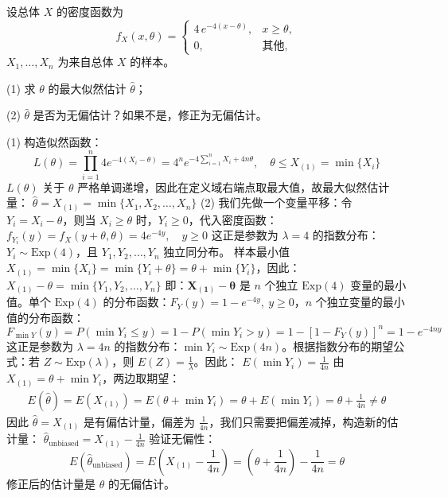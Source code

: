 \documentclass[lang=cn,11pt]{elegantbook}
\begin{document}
\begin{exercise}\label{exer:7-exp4-shift}
设总体 \(X\) 的密度函数为
\[
f_X(x,\theta) = \begin{cases} 4\,e^{-4(x-\theta)}, & x \geq \theta, \\ 0, & \text{其他}, \end{cases}
\]
\(X_1, \dots, X_n\) 为来自总体 \(X\) 的样本。\par
(1) 求 \(\theta\) 的最大似然估计 \(\hat{\theta}\)；\par
(2) \(\hat{\theta}\) 是否为无偏估计？如果不是，修正为无偏估计。
\end{exercise}
\begin{solution}
(1) 构造似然函数：
$$L(\theta) = \prod_{i=1}^n 4 e^{-4(X_i-\theta)} = 4^n e^{-4\sum_{i=1}^n X_i + 4n\theta}, \quad \theta \leq X_{(1)} = \min\{X_i\}$$
$L(\theta)$ 关于 $\theta$ 严格单调递增，因此在定义域右端点取最大值，故最大似然估计量：
\(\hat{\theta} = X_{(1)} = \min\{X_1,X_2,\dots,X_n\}\)
(2) 我们先做一个变量平移：令 $Y_i = X_i - \theta$，则当 $X_i \geq \theta$ 时，$Y_i \geq 0$，代入密度函数：
  \(  f_{Y_i}(y) = f_X(y+\theta,\theta) = 4 e^{-4y}, \quad y \geq 0  \)
  这正是参数为 $\lambda=4$ 的指数分布：$Y_i \sim \text{Exp}(4)$，且 $Y_1,Y_2,\dots,Y_n$ 独立同分布。
样本最小值 $X_{(1)} = \min\{X_i\} = \min\{Y_i+\theta\} = \theta + \min\{Y_i\}$，因此：
  \(  X_{(1)} - \theta = \min\{Y_1,Y_2,\dots,Y_n\}  \)
  即：$\mathbf{X_{(1)} - \theta}$ 是 $n$ 个独立 $\text{Exp}(4)$ 变量的最小值。单个 $\text{Exp}(4)$ 的分布函数：$F_Y(y) = 1 - e^{-4y},\ y\geq0$，$n$ 个独立变量的最小值的分布函数：
  $$  F_{\min Y}(y) = P(\min Y_i \leq y) = 1 - P(\min Y_i > y) = 1 - [1-F_Y(y)]^n = 1 - e^{-4ny}  $$
  这正是参数为 $\lambda=4n$ 的指数分布：$\min Y_i \sim \text{Exp}(4n)$。根据指数分布的期望公式：若 $Z \sim \text{Exp}(\lambda)$，则 $E(Z) = \frac{1}{\lambda}$。因此：
  \(  E\left(\min Y_i\right) = \frac{1}{4n}  \)
由 $X_{(1)} = \theta + \min Y_i$，两边取期望：
\begin{align*}
E(\hat{\theta}) = E(X_{(1)}) = E\left(\theta + \min Y_i\right) = \theta + E\left(\min Y_i\right) = \theta + \frac{1}{4n}\neq \theta
\end{align*}
因此 $\hat{\theta} = X_{(1)}$ 是有偏估计量，偏差为 $\frac{1}{4n}$，我们只需要把偏差减掉，构造新的估计量：
\(
\hat{\theta}_{\text{unbiased}} = X_{(1)} - \frac{1}{4n}
\)
验证无偏性：
$$
E\left(\hat{\theta}_{\text{unbiased}}\right) = E\left(X_{(1)} - \frac{1}{4n}\right) = \left(\theta + \frac{1}{4n}\right) - \frac{1}{4n} = \theta
$$
修正后的估计量是 $\theta$ 的无偏估计。
\end{solution}
\end{document}
